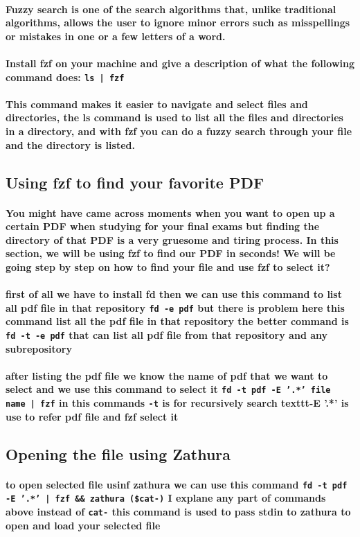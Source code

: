 \documentclass[12pt]{article}
\begin{document}
\paragraph{Fuzzy search is one of the search algorithms that, unlike traditional algorithms, allows the user to ignore minor errors such as misspellings or mistakes in one or a few letters of a word.}
\paragraph{Install fzf on your machine and give a description of what the following command does: \texttt{ls | fzf}}
\paragraph{This command makes it easier to navigate and select files and directories, the ls command is used to list all the files and directories in a directory, and with fzf you can do a fuzzy search through your file and the directory is listed.}
\subsection{Using fzf to find your favorite PDF}
\paragraph{You might have came across moments when you want to open up a certain PDF when studying for your final exams but finding the directory of that PDF is a very gruesome and tiring process. In this section, we will be using fzf to find our PDF in seconds! We will be going step by step on how to find your file and use fzf to select it?}
\paragraph{first of all we have to install fd then we can use this command to list all pdf file in that repository \texttt{fd -e pdf} but there is problem here this command list all the pdf file in that repository the better command is \texttt{fd -t -e pdf} that can list all pdf file from that repository and any subrepository }
\paragraph{after listing the pdf file we know the name of pdf that we want to select and we use this command to select it \texttt{fd -t pdf -E '.*' file name | fzf} in this commands \texttt{-t} is for  recursively search texttt{-E '.*'} is use to refer pdf file and fzf select it}

\subsection{Opening the file using Zathura}
\paragraph{to open selected file usinf zathura we can use this command \texttt{fd -t pdf -E '.*' | fzf \&\& zathura (\$cat-)}  I explane any part of commands above instead of \texttt{cat-} this command is used to pass stdin to zathura to open and load your selected file}
\end{document}
